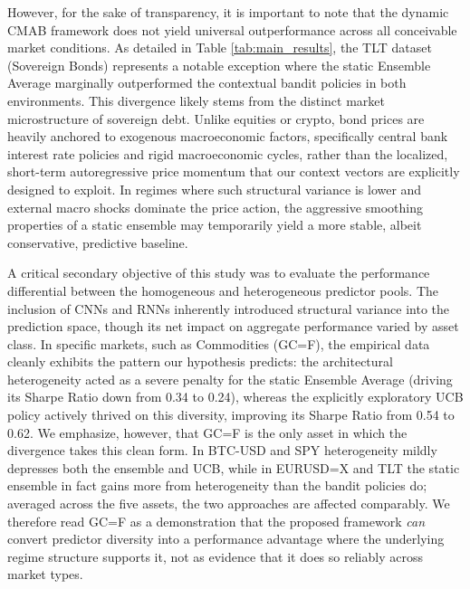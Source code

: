 \documentclass[pdflatex,sn-mathphys-num]{sn-jnl}
\theoremstyle{thmstyleone}%
\theoremstyle{thmstyletwo}%
\theoremstyle{thmstylethree}%
\begin{document}
However, for the sake of transparency, it is important to note that the dynamic CMAB framework does not yield universal outperformance across all conceivable market conditions. As detailed in Table \ref{tab:main_results}, the TLT dataset (Sovereign Bonds) represents a notable exception where the static Ensemble Average marginally outperformed the contextual bandit policies in both environments. This divergence likely stems from the distinct market microstructure of sovereign debt. Unlike equities or crypto, bond prices are heavily anchored to exogenous macroeconomic factors, specifically central bank interest rate policies and rigid macroeconomic cycles, rather than the localized, short-term autoregressive price momentum that our context vectors are explicitly designed to exploit. In regimes where such structural variance is lower and external macro shocks dominate the price action, the aggressive smoothing properties of a static ensemble may temporarily yield a more stable, albeit conservative, predictive baseline.

A critical secondary objective of this study was to evaluate the performance differential between the homogeneous and heterogeneous predictor pools. The inclusion of CNNs and RNNs inherently introduced structural variance into the prediction space, though its net impact on aggregate performance varied by asset class. In specific markets, such as Commodities (GC=F), the empirical data cleanly exhibits the pattern our hypothesis predicts: the architectural heterogeneity acted as a severe penalty for the static Ensemble Average (driving its Sharpe Ratio down from 0.34 to 0.24), whereas the explicitly exploratory UCB policy actively thrived on this diversity, improving its Sharpe Ratio from 0.54 to 0.62. We emphasize, however, that GC=F is the only asset in which the divergence takes this clean form. In BTC-USD and SPY heterogeneity mildly depresses both the ensemble and UCB, while in EURUSD=X and TLT the static ensemble in fact gains more from heterogeneity than the bandit policies do; averaged across the five assets, the two approaches are affected comparably. We therefore read GC=F as a demonstration that the proposed framework \emph{can} convert predictor diversity into a performance advantage where the underlying regime structure supports it, not as evidence that it does so reliably across market types.
\end{document}
